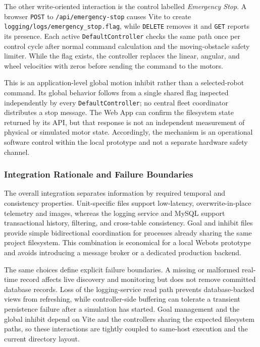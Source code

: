 The other write-oriented interaction is the control labelled \emph{Emergency Stop}. A browser \texttt{POST} to \texttt{/api/emergency-stop} causes Vite to create \texttt{logging/logs/emergency\_stop.flag}, while \texttt{DELETE} removes it and \texttt{GET} reports its presence. Each active \texttt{DefaultController} checks the same path once per control cycle after normal command calculation and the moving-obstacle safety limiter. While the flag exists, the controller replaces the linear, angular, and wheel velocities with zeros before sending the command to the motors.

This is an application-level global motion inhibit rather than a selected-robot command. Its global behavior follows from a single shared flag inspected independently by every \texttt{DefaultController}; no central fleet coordinator distributes a stop message. The Web App can confirm the filesystem state returned by its API, but that response is not an independent measurement of physical or simulated motor state. Accordingly, the mechanism is an operational software control within the local prototype and not a separate hardware safety channel.

\subsubsection{Integration Rationale and Failure Boundaries}

The overall integration separates information by required temporal and consistency properties. Unit-specific files support low-latency, overwrite-in-place telemetry and images, whereas the logging service and MySQL support transactional history, filtering, and cross-table consistency. Goal and inhibit files provide simple bidirectional coordination for processes already sharing the same project filesystem. This combination is economical for a local Webots prototype and avoids introducing a message broker or a dedicated production backend.

The same choices define explicit failure boundaries. A missing or malformed real-time record affects live discovery and monitoring but does not remove committed database records. Loss of the logging-service read path prevents database-backed views from refreshing, while controller-side buffering can tolerate a transient persistence failure after a simulation has started. Goal management and the global inhibit depend on Vite and the controllers sharing the expected filesystem paths, so these interactions are tightly coupled to same-host execution and the current directory layout.

